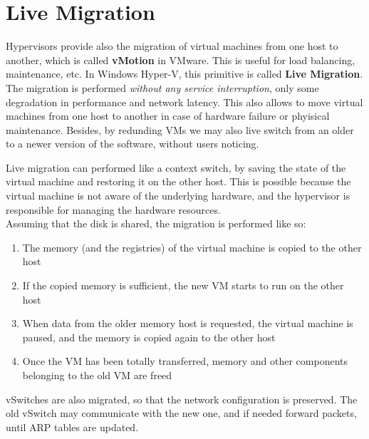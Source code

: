 {\ns{}

\section{Live Migration}
Hypervisors provide also the migration of virtual machines from one host to another, which is called \textbf{vMotion} in VMware. This is useful for load balancing, maintenance, etc. In Windows Hyper-V, this primitive is called \textbf{Live Migration}.\\
The migration is performed \textit{without any service interruption}, only some degradation in performance and network latency.
This also allows to move virtual machines from one host to another in case of hardware failure or phyisical maintenance.
Besides, by redunding VMs we may also live switch from an older to a newer version of the software, without users noticing.

Live migration can performed like a context switch, by saving the state of the virtual machine and restoring it on the other host. This is possible because the virtual machine is not aware of the underlying hardware, and the hypervisor is responsible for managing the hardware resources.\\
Assuming that the disk is shared, the migration is performed like so:
\begin{enumerate}
   \item The memory (and the registries) of the virtual machine is copied to the other host
   \item If the copied memory is sufficient, the new VM starts to run on the other host
   \item When data from the older memory host is requested, the virtual machine is paused, and the memory is copied again to the other host
   \item Once the VM has been totally transferred, memory and other components belonging to the old VM are freed
\end{enumerate}

vSwitches are also migrated, so that the network configuration is preserved. The old vSwitch may communicate with the new one, and if needed forward packets, until ARP tables are updated.

}
